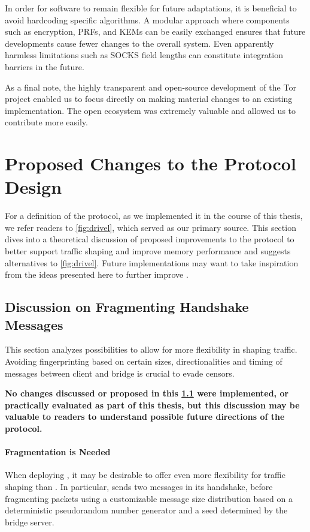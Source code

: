 In order for software to remain flexible for future adaptations, it is beneficial to avoid hardcoding specific algorithms. A modular approach where components such as encryption, PRFs, and KEMs can be easily exchanged ensures that future developments cause fewer changes to the overall system. Even apparently harmless limitations such as SOCKS field lengths can constitute integration barriers in the future.

As a final note, the highly transparent and open-source development of the Tor project enabled us to focus directly on making material changes to an existing implementation. The open ecosystem was extremely valuable and allowed us to contribute more easily.

\section{Proposed Changes to the Protocol Design} \label{sec:protocol-changes}

For a definition of the \drivel{} protocol, as we implemented it in the course of this thesis, we refer readers to \cref{fig:drivel}, which served as our primary source.
This section dives into a theoretical discussion of proposed improvements to the protocol to better support traffic shaping and improve memory performance and suggests alternatives to \cref{fig:drivel}.
Future implementations may want to take inspiration from the ideas presented here to further improve \drivel{}.

\subsection{Discussion on Fragmenting Handshake Messages} \label{ssec:fragmentation}

This section analyzes possibilities to allow for more flexibility in shaping \drivel{} traffic. Avoiding fingerprinting based on certain sizes, directionalities and timing of messages between client and bridge is crucial to evade censors.

\textbf{No changes discussed or proposed in this \cref{ssec:fragmentation} were implemented, or practically evaluated as part of this thesis, but this discussion may be valuable to readers to understand possible future directions of the protocol.}

\paragraph{Fragmentation is Needed}
When deploying \drivel{}, it may be desirable to offer even more flexibility for traffic shaping than \obfsfour{}. In particular, \obfsfour{} sends two messages in its handshake, before fragmenting packets using a customizable message size distribution based on a deterministic pseudorandom number generator and a seed determined by the bridge server.


